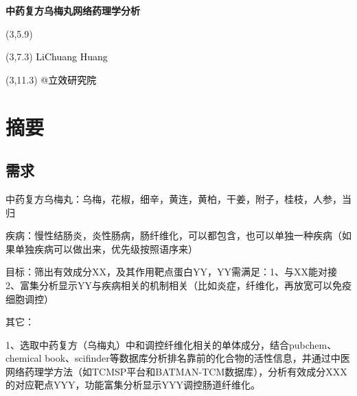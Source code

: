 \documentclass[
]{article}
\author{}
\date{\vspace{-2.5em}}
\begin{document}
\begin{titlepage} 
\begin{center} \textbf{\Huge
中药复方乌梅丸网络药理学分析} \vspace{4em}
\begin{textblock}{10}(3,5.9) \huge
\textbf{\textcolor{white}{2024-04-18}}
\end{textblock} \begin{textblock}{10}(3,7.3)
\Large \textcolor{black}{LiChuang Huang}
\end{textblock} \begin{textblock}{10}(3,11.3)
\Large \textcolor{black}{@立效研究院}
\end{textblock} \end{center} \end{titlepage}
\restoregeometry


\tableofcontents

\listoffigures

\listoftables

\newpage


\hypertarget{abstract}{%
\section{摘要}\label{abstract}}

\hypertarget{ux9700ux6c42}{%
\subsection{需求}\label{ux9700ux6c42}}

中药复方乌梅丸：乌梅，花椒，细辛，黄连，黄柏，干姜，附子，桂枝，人参，当归

疾病：慢性结肠炎，炎性肠病，肠纤维化，可以都包含，也可以单独一种疾病（如果单独疾病可以做出来，优先级按照语序来）

目标：筛出有效成分XX，及其作用靶点蛋白YY，YY需满足：1、与XX能对接 2、富集分析显示YY与疾病相关的机制相关（比如炎症，纤维化，再放宽可以免疫细胞调控）

其它：

1、选取中药复方（乌梅丸）中和调控纤维化相关的单体成分，结合pubchem、chemical book、scifinder等数据库分析排名靠前的化合物的活性信息，并通过中医网络药理学方法（如TCMSP平台和BATMAN-TCM数据库），分析有效成分XXX的对应靶点YYY，功能富集分析显示YYY调控肠道纤维化。
\end{document}
